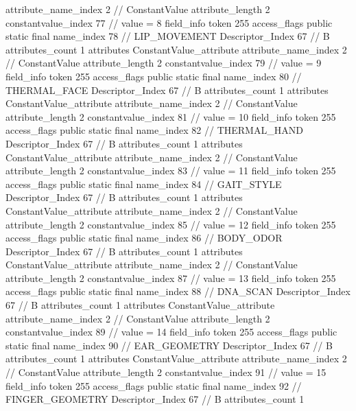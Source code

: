 {{{{{{{					attribute_name_index	2		// ConstantValue
					attribute_length	2
					constantvalue_index	77		// value = 8
				}
				}
			}
			field_info {
				token	255
				access_flags	public static final
				name_index	78		// LIP_MOVEMENT
				Descriptor_Index	67		// B
				attributes_count	1
				attributes {
				ConstantValue_attribute {
					attribute_name_index	2		// ConstantValue
					attribute_length	2
					constantvalue_index	79		// value = 9
				}
				}
			}
			field_info {
				token	255
				access_flags	public static final
				name_index	80		// THERMAL_FACE
				Descriptor_Index	67		// B
				attributes_count	1
				attributes {
				ConstantValue_attribute {
					attribute_name_index	2		// ConstantValue
					attribute_length	2
					constantvalue_index	81		// value = 10
				}
				}
			}
			field_info {
				token	255
				access_flags	public static final
				name_index	82		// THERMAL_HAND
				Descriptor_Index	67		// B
				attributes_count	1
				attributes {
				ConstantValue_attribute {
					attribute_name_index	2		// ConstantValue
					attribute_length	2
					constantvalue_index	83		// value = 11
				}
				}
			}
			field_info {
				token	255
				access_flags	public static final
				name_index	84		// GAIT_STYLE
				Descriptor_Index	67		// B
				attributes_count	1
				attributes {
				ConstantValue_attribute {
					attribute_name_index	2		// ConstantValue
					attribute_length	2
					constantvalue_index	85		// value = 12
				}
				}
			}
			field_info {
				token	255
				access_flags	public static final
				name_index	86		// BODY_ODOR
				Descriptor_Index	67		// B
				attributes_count	1
				attributes {
				ConstantValue_attribute {
					attribute_name_index	2		// ConstantValue
					attribute_length	2
					constantvalue_index	87		// value = 13
				}
				}
			}
			field_info {
				token	255
				access_flags	public static final
				name_index	88		// DNA_SCAN
				Descriptor_Index	67		// B
				attributes_count	1
				attributes {
				ConstantValue_attribute {
					attribute_name_index	2		// ConstantValue
					attribute_length	2
					constantvalue_index	89		// value = 14
				}
				}
			}
			field_info {
				token	255
				access_flags	public static final
				name_index	90		// EAR_GEOMETRY
				Descriptor_Index	67		// B
				attributes_count	1
				attributes {
				ConstantValue_attribute {
					attribute_name_index	2		// ConstantValue
					attribute_length	2
					constantvalue_index	91		// value = 15
				}
				}
			}
			field_info {
				token	255
				access_flags	public static final
				name_index	92		// FINGER_GEOMETRY
				Descriptor_Index	67		// B
				attributes_count	1
}}}}}
